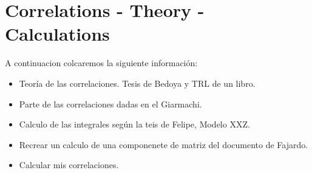 \chapter{Correlations - Theory - Calculations}
A continuacion colcaremos la siguiente información:
\begin{itemize}
    \item Teoría de las correlaciones. Tesis de Bedoya y TRL de un libro.
    \item Parte de las correlaciones dadas en el Giarmachi.
    \item  Calculo de las integrales según la teis de Felipe, Modelo XXZ.
    \item Recrear un calculo de una componenete de matriz del documento de Fajardo.
    \item Calcular mis correlaciones.
\end{itemize}
